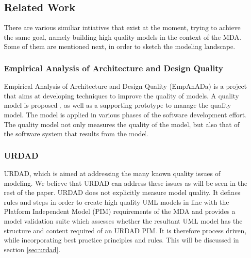 
\subsection{Related Work}
There are various similiar intiatives that exist at the moment, trying to achieve the same goal, namely building high quality models in the context of the MDA. Some of them are mentioned next, in order to sketch the modeling landscape.


\subsubsection{Empirical Analysis of Architecture and Design Quality} 
Empirical Analysis of Architecture and Design Quality (EmpAnADa) \cite{lange_2004:anEmpiricalAssessmentOfCompletenessInUmlDesign} is a project that aims at developing techniques to improve the quality of models. A quality model is proposed \cite{lange_2005:managingModelQuality}, as well as a supporting prototype to manage the quality model. The model is applied in various phases of the software development effort. The quality model not only measures the quality of the model, but also that of the software system that results from the model.


\subsubsection{URDAD}
URDAD, which is aimed at addressing the many known quality issues of modeling. We believe that URDAD can address these issues as will be seen in the rest of the paper. URDAD does not explicitly measure model quality. It defines rules and steps in order to create high quality UML models in line with the Platform Independent Model (PIM) requirements of the MDA and provides a model validation suite which assesses whether the resultant UML model has the structure and content required of an URDAD PIM. It is therefore process driven, while incorporating best practice principles and rules. This will be discussed in section \ref{sec:urdad}.

